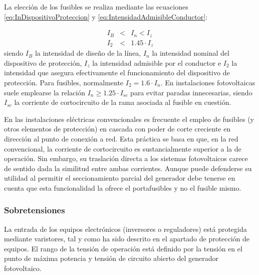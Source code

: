 La elección de los fusibles se realiza mediante las ecuaciones \ref{eq:InDispositivoProteccion}
y \ref{eq:IntensidadAdmisibleConductor}:

\begin{eqnarray}
I_{B} & < & I_{n}<I_{z}\label{eq:InDispositivoProteccion}\\
I_{2} & < & 1.45\cdot I_{z}\label{eq:IntensidadAdmisibleConductor}\end{eqnarray}
siendo $I_{B}$ la intensidad de diseño de la línea, $I_{n}$ la intensidad
nominal del dispositivo de protección, $I_{z}$ la intensidad admisible
por el conductor e $I_{2}$ la intensidad que asegura efectivamente
el funcionamiento del dispositivo de protección.  
Para fusibles, normalmente $I_{2}=1.6\cdot I_{n}$. En instalaciones
fotovoltaicas suele emplearse la relación $I_{n}\geq1.25\cdot I_{sc}$
para evitar paradas innecesarias, siendo $I_{sc}$ la corriente de
cortocircuito de la rama asociada al fusible en cuestión.

En las instalaciones eléctricas convencionales es frecuente el empleo
de fusibles (y otros elementos de protección) en cascada con poder
de corte creciente en dirección al punto de conexión a red. Esta práctica
se basa en que, en la red convencional, la corriente de cortocircuito
es sustancialmente superior a la de operación. Sin embargo, su traslación
directa a los sistemas fotovoltaicos carece de sentido dada la similitud
entre ambas corrientes. Aunque puede defenderse su utilidad al permitir
el seccionamiento parcial del generador debe tenerse en cuenta que
esta funcionalidad la ofrece el portafusibles y no el fusible mismo. 


\subsubsection{Sobretensiones}

La entrada de los equipos electrónicos (inversores o reguladores)
está protegida mediante varistores, tal y como ha sido descrito en
el apartado de protección de equipos. El rango de la tensión de operación
está definido por la tensión en el punto de máxima potencia y tensión
de circuito abierto del generador fotovoltaico.

